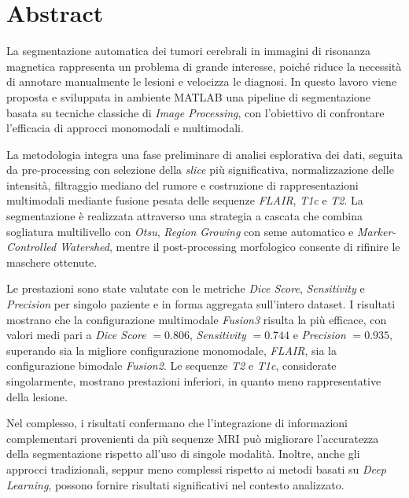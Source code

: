 \chapter*{Abstract}
La segmentazione automatica dei tumori cerebrali in immagini di risonanza magnetica rappresenta un problema di grande interesse, poiché riduce la necessità di annotare manualmente le lesioni e velocizza le diagnosi. In questo lavoro viene proposta e sviluppata in ambiente MATLAB una pipeline di segmentazione basata su tecniche classiche di \textit{Image Processing}, con l’obiettivo di confrontare l’efficacia di approcci monomodali e multimodali.

La metodologia integra una fase preliminare di analisi esplorativa dei dati, seguita da pre-processing con selezione della \textit{slice} più significativa, normalizzazione delle intensità, filtraggio mediano del rumore e costruzione di rappresentazioni multimodali mediante fusione pesata delle sequenze \textit{FLAIR}, \textit{T1c} e \textit{T2}. La segmentazione è realizzata attraverso una strategia a cascata che combina sogliatura multilivello con \textit{Otsu}, \textit{Region Growing} con seme automatico e \textit{Marker-Controlled Watershed}, mentre il post-processing morfologico consente di rifinire le maschere ottenute.

Le prestazioni sono state valutate con le metriche \textit{Dice Score}, \textit{Sensitivity} e \textit{Precision} per singolo paziente e in forma aggregata sull’intero dataset. I risultati mostrano che la configurazione multimodale \textit{Fusion3} risulta la più efficace, con valori medi pari a \textit{Dice Score} \(= 0.806\), \textit{Sensitivity} \(= 0.744\) e \textit{Precision} \(= 0.935\), superando sia la migliore configurazione monomodale, \textit{FLAIR}, sia la configurazione bimodale \textit{Fusion2}. Le sequenze \textit{T2} e \textit{T1c}, considerate singolarmente, mostrano prestazioni inferiori, in quanto meno rappresentative della lesione.

Nel complesso, i risultati confermano che l’integrazione di informazioni complementari provenienti da più sequenze MRI può migliorare l’accuratezza della segmentazione rispetto all’uso di singole modalità. Inoltre, anche gli approcci tradizionali, seppur meno complessi rispetto ai metodi basati su \textit{Deep Learning}, possono fornire risultati significativi nel contesto analizzato.